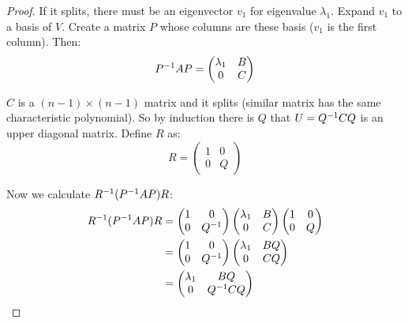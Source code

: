 \begin{proof}
    If it splits, there must be an eigenvector $v_1$ for eigenvalue $\lambda_1$. Expand $v_1$ to a basis of $V$. Create a matrix $P$ whose columns are these basis ($v_1$ is the first column). Then:
    \begin{equation*}
        {P}^{-1} A P = \begin{pmatrix}
            \lambda_1 & B \\
            0 & C
        \end{pmatrix}
    \end{equation*}
    
    $C$ is a $(n-1) \times (n-1)$ matrix and it splits (similar matrix has the same characteristic polynomial). So by induction there is $Q$ that $U= {Q}^{-1} C Q$ is an upper diagonal matrix. Define $R$ as:
    \begin{equation*}
        R = \begin{pmatrix}
            1 & 0 \\
            0 & Q
        \end{pmatrix}
    \end{equation*}
    
    Now we calculate ${R}^{-1} ({P}^{-1} A P) R$:
    \begin{equation*}
        \begin{aligned}
            {R}^{-1} ({P}^{-1} A P) R  &= \begin{pmatrix}
                1 & 0 \\
                0 & {Q}^{-1}
            \end{pmatrix} \begin{pmatrix}
                \lambda_1 & B \\
                0 & C
            \end{pmatrix} \begin{pmatrix}
                1 & 0 \\
                0 & Q
            \end{pmatrix} \\
            & = \begin{pmatrix}
                1 & 0 \\
                0 & {Q}^{-1}
            \end{pmatrix} \begin{pmatrix}
                \lambda_1 & B Q \\
                0 & C Q
            \end{pmatrix} \\
            &= \begin{pmatrix}
                \lambda_1 & BQ \\
                0 & {Q}^{-1} C Q
            \end{pmatrix}
        \end{aligned}     
    \end{equation*}
\end{proof}



